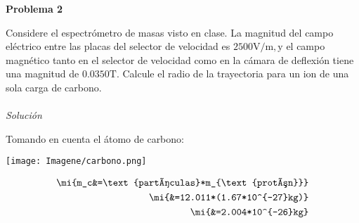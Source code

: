 \documentclass[a4paper,12pt]{article}
\begin{document}
\textbf{Problema 2}

 Considere el espectrómetro de masas visto en clase. La magnitud del campo eléctrico entre las placas del selector de velocidad es $2500 \mathrm{V} / \mathrm{m}, \mathrm{y}$ el campo magnético tanto en el selector de velocidad como en la cámara de deflexión tiene una magnitud de $0.0350 \mathrm{T}$. Calcule el radio de la trayectoria para un ion de una sola carga de carbono.\\\\
\textit{Solución}


Tomando en cuenta el átomo de carbono:
\begin{center}
    \texttt{[image: Imagene/carbono.png]}
\end{center}

\begin{align}
    \mi{m_c&=\text{partículas}*m_{\text{protón}}}\\
    \mi{&=12.011*(1.67*10^{-27}kg)}\\
    \mi{&=2.004*10^{-26}kg}
\end{align}
\end{document}
